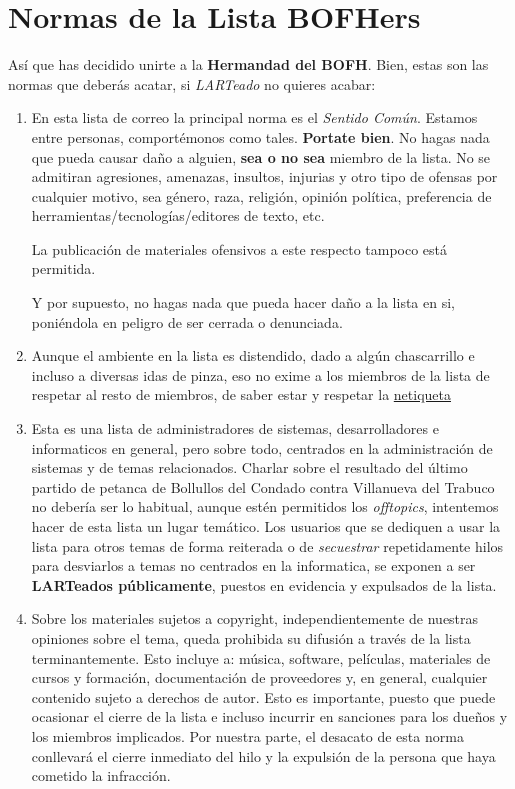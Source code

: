 \section{Normas de la Lista BOFHers}\label{normas-de-la-lista-bofhers}

Así que has decidido unirte a la \textbf{Hermandad del BOFH}. Bien,
estas son las normas que deberás acatar, si \emph{LARTeado} no quieres
acabar:

\begin{enumerate}
\def\labelenumi{\arabic{enumi}.}
\item
  En esta lista de correo la principal norma es el \emph{Sentido Común}.
  Estamos entre personas, comportémonos como tales. \textbf{Portate
  bien}. No hagas nada que pueda causar daño a alguien, \textbf{sea o no
  sea} miembro de la lista. No se admitiran agresiones, amenazas,
  insultos, injurias y otro tipo de ofensas por cualquier motivo, sea
  género, raza, religión, opinión política, preferencia de
  herramientas/tecnologías/editores de texto, etc.

  La publicación de materiales ofensivos a este respecto tampoco está
  permitida.

  Y por supuesto, no hagas nada que pueda hacer daño a la lista en si,
  poniéndola en peligro de ser cerrada o denunciada.
\item
  Aunque el ambiente en la lista es distendido, dado a algún
  chascarrillo e incluso a diversas idas de pinza, eso no exime a los
  miembros de la lista de respetar al resto de miembros, de saber estar
  y respetar la
  \href{https://es.wikipedia.org/wiki/Netiqueta\#Aparici.C3.B3n_de_las_reglas}{netiqueta}
\item
  Esta es una lista de administradores de sistemas, desarrolladores e
  informaticos en general, pero sobre todo, centrados en la
  administración de sistemas y de temas relacionados. Charlar sobre el
  resultado del último partido de petanca de Bollullos del Condado
  contra Villanueva del Trabuco no debería ser lo habitual, aunque estén
  permitidos los \emph{offtopics}, intentemos hacer de esta lista un
  lugar temático. Los usuarios que se dediquen a usar la lista para
  otros temas de forma reiterada o de \emph{secuestrar} repetidamente
  hilos para desviarlos a temas no centrados en la informatica, se
  exponen a ser \textbf{LARTeados públicamente}, puestos en evidencia y
  expulsados de la lista.
\item
  Sobre los materiales sujetos a copyright, independientemente de
  nuestras opiniones sobre el tema, queda prohibida su difusión a través
  de la lista terminantemente. Esto incluye a: música, software,
  películas, materiales de cursos y formación, documentación de
  proveedores y, en general, cualquier contenido sujeto a derechos de
  autor. Esto es importante, puesto que puede ocasionar el cierre de la
  lista e incluso incurrir en sanciones para los dueños y los miembros
  implicados. Por nuestra parte, el desacato de esta norma conllevará el
  cierre inmediato del hilo y la expulsión de la persona que haya
  cometido la infracción.


\end{enumerate}
